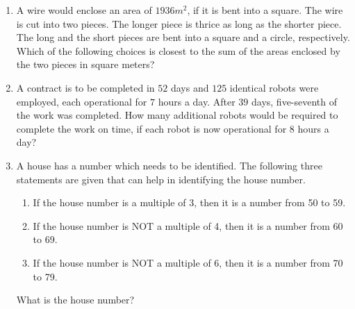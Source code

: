 \documentclass[journal,12pt,onecolumn]{IEEEtran}
\theoremstyle{remark}
\begin{document}
\begin{enumerate}
    \item A wire would enclose an area of $1936 m^{2}$, if it is bent into a square. The wire is cut into two pieces. The longer piece is thrice as long as the shorter piece. The long and the short pieces are bent into a square and a circle, respectively. Which of the following choices is closest to the sum of the areas enclosed by the two pieces in square meters?
    \hfill{}

    \begin{enumerate}
    \end{enumerate}

    \item A contract is to be completed in $52$ days and $125$ identical robots were employed, each operational for $7$ hours a day. After $39$ days, five-seventh of the work was completed. How many additional robots would be required to complete the work on time, if each robot is now operational for $8$ hours a day?
    \hfill{}

    \begin{enumerate}
    \end{enumerate}

    \item A house has a number which needs to be identified. The following three statements are given that can help in identifying the house number.
    \begin{enumerate}
        \item If the house number is a multiple of 3, then it is a number from 50 to 59.
        \item If the house number is NOT a multiple of 4, then it is a number from 60 to 69.
        \item If the house number is NOT a multiple of 6, then it is a number from 70 to 79.
    \end{enumerate}
    What is the house number?
    \hfill{}


\end{enumerate}
\end{document}
